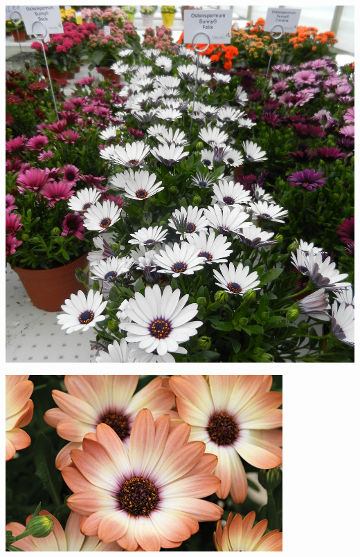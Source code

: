 \documentclass{article}
\begin{document}
\begin{center}
\includegraphics[height=0.9\textheight, angle=90]{../Osteospermum.jpg}
\end{center}
\newpage

\begin{center}
\includegraphics[height=0.9\textheight, angle=90]{../Osteospermum3.jpg}
\end{center}
\newpage
\end{document}
